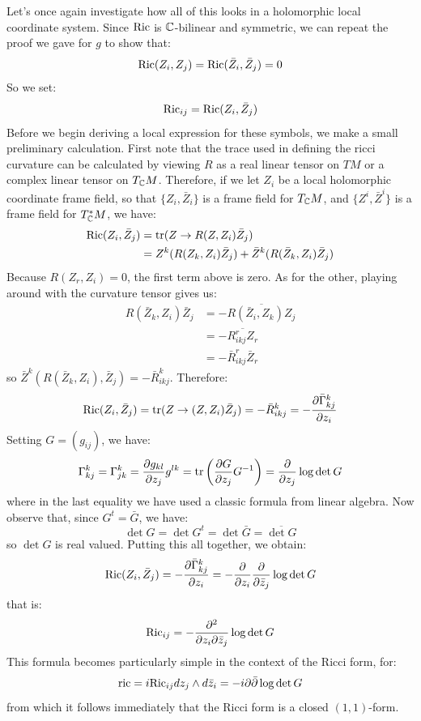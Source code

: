 Let's once again investigate how all of this looks in a holomorphic local coordinate system.  Since $\text{Ric}$ is $\mathbb{C}$-bilinear and symmetric, we can repeat the proof we gave for $g$ to show that:
%
$$ \text{Ric}(Z_i, Z_j ) = \text{Ric}( \bar{Z}_i, \bar{Z}_j )= 0 $$
%
So we set:
%
$$ \text{Ric}_{ij} = \text{Ric}( Z_i, \bar{Z}_j ) $$
%
Before we begin deriving a local expression for these symbols, we make a small preliminary calculation.  First note that the trace used in defining the ricci curvature can be calculated by viewing $R$ as a real linear tensor on $TM$ or a complex linear tensor on $T_{\mathbb{C}}M$.  Therefore, if we let $Z_i$ be a local holomorphic coordinate frame field, so that $\{ Z_i, \bar{Z}_i \}$ is a frame field for $T_{\mathbb{C}}M$, and $\{ Z^i, \bar{Z}^i \}$ is a frame field for $T^*_{\mathbb{C}}M$, we have:
%
\begin{align*}
\text{Ric}( Z_i, \bar{Z}_j ) &= \text{tr}( Z \rightarrow R( Z, Z_i ) \bar{Z}_j ) \\
&= Z^k( R(Z_k, Z_i) \bar{Z}_j ) + \bar{Z}^k ( R( \bar{Z}_k, Z_i ) \bar{Z}_j )
\end{align*}
%
Because $R(Z_r, Z_i) = 0$, the first term above is zero.  As for the other, playing around with the curvature tensor gives us:
%
\begin{align*}
R( \bar{Z}_k, Z_i ) \bar{Z}_j &= - \overline{ R( \bar{Z}_i, Z_k ) Z_j } \\
&= - \overline{ R_{ikj}^r Z_r } \\
&= - \bar{R}_{ikj}^r \bar{Z}_r
\end{align*}
%
so $\bar{Z}^k( R( \bar{Z}_k, Z_i ), \bar{Z}_j ) = - \bar{R}^k_{ikj}$.  Therefore:
%
$$ \text{Ric}( Z_i, \bar{Z}_j ) = \text{tr}( Z \rightarrow( Z, Z_i ) \bar{Z}_j ) = - \bar{R}_{ikj}^k = - \frac{ \partial \bar{ \Gamma }_{kj}^k }{ \partial z_i } $$
%
Setting $G = (g_{ij})$, we have:
%
$$ \Gamma_{kj}^k = \Gamma_{jk}^k = \frac{ \partial g_{kl} }{ \partial z_j } g^{lk} = \text{tr} \left( \frac{ \partial G }{ \partial z_j } G^{-1} \right) = \frac{ \partial }{ \partial z_j } \log \det G $$
%
where in the last equality we have used a classic formula from linear algebra.  Now observe that, since $G^t = \bar{G}$, we have:
%
$$ \det G = \det G^t = \det \bar{G} = \overline { \det G } $$
%
so $\det G$ is real valued.  Putting this all together, we obtain:
%
$$ \text{Ric}( Z_i, \bar{Z}_j ) = - \frac{ \partial \bar{ \Gamma }_{kj}^k }{ \partial z_i } = - \frac{ \partial }{ \partial z_i } \frac{ \partial }{ \partial \bar{z}_j } \log \det G $$
%
that is:
%
$$ \text{Ric}_{ij} = - \frac{ \partial^2 }{ \partial z_i \partial \bar{z}_j } \log \det G $$
%
This formula becomes particularly simple in the context of the Ricci form, for:
%
$$ \text{ric} = i \text{Ric}_{ij} d z_j \wedge d \bar{z}_i = - i \partial \bar{\partial} \log \det G $$
%
from which it follows immediately that the Ricci form is a closed $(1,1)$-form.

